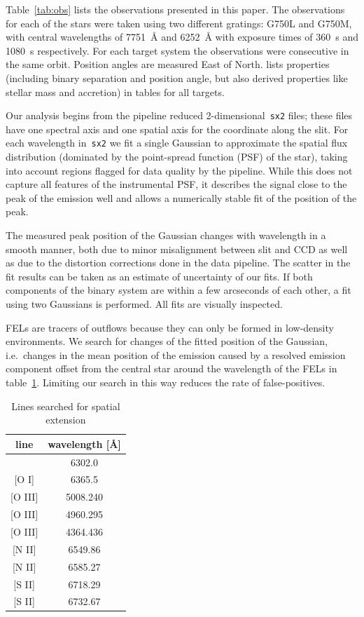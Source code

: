 \documentclass[twocolumn,trackchanges]{aastex62}
\begin{document}
Table~\ref{tab:obs} lists the observations presented in this paper. The
observations for each of the stars were taken using two different gratings:
G750L and G750M, with central wavelengths of 7751~\AA{} and 6252~\AA{} with
exposure times of 360~s and 1080~s respectively. For each target system the observations were consecutive in the same orbit. Position angles are measured East of North. \citet{2003ApJ...583..334H} lists properties (including binary separation and position angle, but also derived properties like stellar mass and accretion) in tables for all targets.

Our analysis begins from the pipeline reduced
2-dimensional~\texttt{sx2} files; these files have one spectral axis and
one spatial axis for the coordinate along the slit. For each wavelength
in~\texttt{sx2} we fit a single Gaussian to approximate the spatial flux distribution (dominated by the point-spread function (PSF) of the star), taking into account regions
flagged for data quality by the pipeline. While this does not capture
all features of the instrumental PSF, it describes the signal close to the
peak of the emission well and allows a numerically stable fit of the
position of the peak.

The measured peak position  of the Gaussian changes with
wavelength in a smooth manner, both due to minor misalignment between slit and CCD as well as due to the distortion corrections done in the data
pipeline. The scatter in the fit results can be
taken as an estimate of uncertainty of our fits.
If both components of the binary system are within a few arcseconds of
each other, a fit using two Gaussians is performed. All fits are
visually inspected. 

FELs are tracers of outflows because they can only be formed in low-density
environments. We search for changes
of the fitted position of the Gaussian, i.e.\ changes in the mean
position of the emission caused by a resolved emission component offset from
the central star around the wavelength of the FELs in table~\ref{tab:searchedlines}. Limiting our search in this way reduces the
rate of false-positives. 


\begin{table}
\caption{{Lines searched for spatial extension\label{tab:searchedlines}}}
\begin{center}
\begin{tabular}{cc}
\hline\hline
line & wavelength [\AA] \\
\hline
[O I] & 6302.0\\{}
[O I] & 6365.5\\{}
[O III] & 5008.240\\{}
[O III] & 4960.295\\{}
[O III] & 4364.436\\{}
[N II] & 6549.86\\{}
[N II] & 6585.27\\{}
[S II] & 6718.29\\{}
[S II] & 6732.67\\
\hline
\end{tabular}
\end{center}
\end{table}
\end{document}
